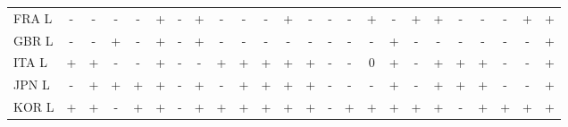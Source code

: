 \documentclass[12pt,bibliography=totoc]{article}
\begin{document}
\begin{appendices}
\begin{table}[H]
\begin{tabular}{l  cccccccc@{\hskip 0.2in}  cccccccc@{\hskip 0.2in}   ccccccc}
FRA L	&\cellcolor{red!25}-	&\cellcolor{red!25}-	&\cellcolor{red!25}-	&\cellcolor{red!25}-	&\cellcolor{green!25}+	&\cellcolor{red!25}-	&\cellcolor{green!25}+	&\cellcolor{red!25}-	&\cellcolor{red!25}-	&\cellcolor{red!25}-	&\cellcolor{green!25}+	&\cellcolor{red!25}-	&\cellcolor{red!25}-	&\cellcolor{red!25}-	&\cellcolor{green!25}+	&\cellcolor{red!25}-	&\cellcolor{green!25}+	&\cellcolor{green!25}+	&\cellcolor{red!25}-	&\cellcolor{red!25}-	&\cellcolor{red!25}-	&\cellcolor{green!25}+	&\cellcolor{green!25}+\\
GBR L	&\cellcolor{red!25}-	&\cellcolor{red!25}-	&\cellcolor{green!25}+	&\cellcolor{red!25}-	&\cellcolor{green!25}+	&\cellcolor{red!25}-	&\cellcolor{green!25}+	&\cellcolor{red!25}-	&\cellcolor{red!25}-	&\cellcolor{red!25}-	&\cellcolor{red!25}-	&\cellcolor{red!25}-	&\cellcolor{red!25}-	&\cellcolor{red!25}-	&\cellcolor{red!25}-	&\cellcolor{green!25}+	&\cellcolor{red!25}-	&\cellcolor{red!25}-	&\cellcolor{red!25}-	&\cellcolor{red!25}-	&\cellcolor{red!25}-	&\cellcolor{red!25}-	&\cellcolor{green!25}+\\
ITA L	&\cellcolor{green!25}+	&\cellcolor{green!25}+	&\cellcolor{red!25}-	&\cellcolor{red!25}-	&\cellcolor{green!25}+	&\cellcolor{red!25}-	&\cellcolor{red!25}-	&\cellcolor{green!25}+	&\cellcolor{green!25}+	&\cellcolor{green!25}+	&\cellcolor{green!25}+	&\cellcolor{green!25}+	&\cellcolor{red!25}-	&\cellcolor{red!25}-	&\cellcolor{yellow!25}0	&\cellcolor{green!25}+	&\cellcolor{red!25}-	&\cellcolor{green!25}+	&\cellcolor{green!25}+	&\cellcolor{green!25}+	&\cellcolor{red!25}-	&\cellcolor{red!25}-	&\cellcolor{green!25}+\\
JPN L	&\cellcolor{red!25}-	&\cellcolor{green!25}+	&\cellcolor{green!25}+	&\cellcolor{green!25}+	&\cellcolor{green!25}+	&\cellcolor{red!25}-	&\cellcolor{green!25}+	&\cellcolor{red!25}-	&\cellcolor{green!25}+	&\cellcolor{green!25}+	&\cellcolor{green!25}+	&\cellcolor{green!25}+	&\cellcolor{red!25}-	&\cellcolor{red!25}-	&\cellcolor{red!25}-	&\cellcolor{green!25}+	&\cellcolor{red!25}-	&\cellcolor{green!25}+	&\cellcolor{green!25}+	&\cellcolor{green!25}+	&\cellcolor{red!25}-	&\cellcolor{red!25}-	&\cellcolor{green!25}+\\
KOR L	&\cellcolor{green!25}+	&\cellcolor{green!25}+	&\cellcolor{red!25}-	&\cellcolor{green!25}+	&\cellcolor{green!25}+	&\cellcolor{red!25}-	&\cellcolor{green!25}+	&\cellcolor{green!25}+	&\cellcolor{green!25}+	&\cellcolor{green!25}+	&\cellcolor{green!25}+	&\cellcolor{green!25}+	&\cellcolor{red!25}-	&\cellcolor{green!25}+	&\cellcolor{green!25}+	&\cellcolor{green!25}+	&\cellcolor{green!25}+	&\cellcolor{green!25}+	&\cellcolor{red!25}-	&\cellcolor{green!25}+	&\cellcolor{green!25}+	&\cellcolor{green!25}+	&\cellcolor{green!25}+\\

\end{tabular}
\end{table}
\end{appendices}
\end{document}

